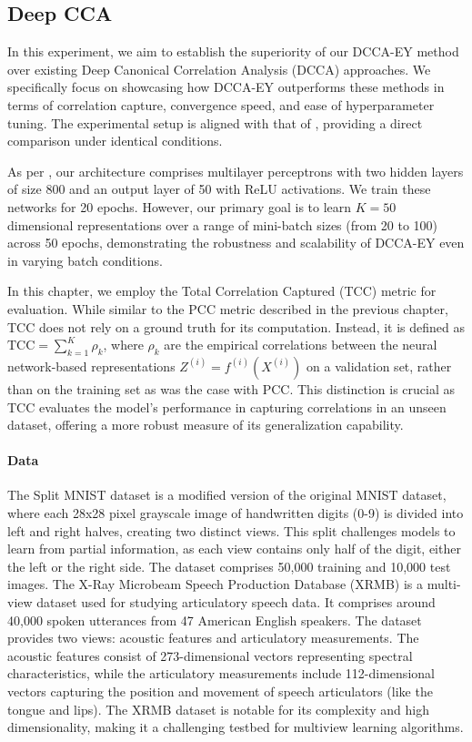 \subsection{Deep CCA}\label{sec:experiments-DCCA}
In this experiment, we aim to establish the superiority of our DCCA-EY method over existing Deep Canonical Correlation Analysis (DCCA) approaches.
We specifically focus on showcasing how DCCA-EY outperforms these methods in terms of correlation capture, convergence speed, and ease of hyperparameter tuning.
The experimental setup is aligned with that of \citet{wang2015stochastic}, providing a direct comparison under identical conditions.

As per \citet{wang2015stochastic}, our architecture comprises multilayer perceptrons with two hidden layers of size 800 and an output layer of 50 with ReLU activations.
We train these networks for 20 epochs.
However, our primary goal is to learn $K=50$ dimensional representations over a range of mini-batch sizes (from 20 to 100) across 50 epochs, demonstrating the robustness and scalability of DCCA-EY even in varying batch conditions.

In this chapter, we employ the Total Correlation Captured (TCC) metric for evaluation.
While similar to the PCC metric described in the previous chapter, TCC does not rely on a ground truth for its computation.
Instead, it is defined as \( \text{TCC} = \sum_{k=1}^K \rho_k \), where $\rho_k$ are the empirical correlations between the neural network-based representations $Z^{(i)} = f^{(i)}(X^{(i)})$ on a validation set, rather than on the training set as was the case with PCC. This distinction is crucial as TCC evaluates the model's performance in capturing correlations in an unseen dataset, offering a more robust measure of its generalization capability.
\paragraph{Data}
The Split MNIST dataset is a modified version of the original MNIST dataset, where each 28x28 pixel grayscale image of handwritten digits (0-9) is divided into left and right halves, creating two distinct views.
This split challenges models to learn from partial information, as each view contains only half of the digit, either the left or the right side.
The dataset comprises 50,000 training and 10,000 test images.
The X-Ray Microbeam Speech Production Database (XRMB) is a multi-view dataset used for studying articulatory speech data.
It comprises around 40,000 spoken utterances from 47 American English speakers.
The dataset provides two views: acoustic features and articulatory measurements.
The acoustic features consist of 273-dimensional vectors representing spectral characteristics, while the articulatory measurements include 112-dimensional vectors capturing the position and movement of speech articulators (like the tongue and lips).
The XRMB dataset is notable for its complexity and high dimensionality, making it a challenging testbed for multiview learning algorithms.

